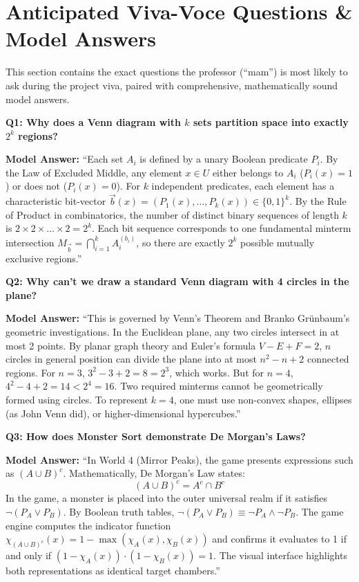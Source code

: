 \documentclass[11pt,a4paper]{article}
\theoremstyle{definition}
\begin{document}
\newpage
\section{Anticipated Viva-Voce Questions \& Model Answers}

This section contains the exact questions the professor (``mam'') is most likely to ask during the project viva, paired with comprehensive, mathematically sound model answers.

\begin{vivabox}
\textbf{Q1: Why does a Venn diagram with $k$ sets partition space into exactly $2^k$ regions?}

\textbf{Model Answer:}
``Each set $A_i$ is defined by a unary Boolean predicate $P_i$. By the Law of Excluded Middle, any element $x \in U$ either belongs to $A_i$ ($P_i(x) = 1$) or does not ($P_i(x) = 0$). For $k$ independent predicates, each element has a characteristic bit-vector $\vec{b}(x) = (P_1(x), \dots, P_k(x)) \in \{0, 1\}^k$. By the Rule of Product in combinatorics, the number of distinct binary sequences of length $k$ is $2 \times 2 \times \dots \times 2 = 2^k$. Each bit sequence corresponds to one fundamental minterm intersection $M_{\vec{b}} = \bigcap_{i=1}^k A_i^{(b_i)}$, so there are exactly $2^k$ possible mutually exclusive regions.''
\end{vivabox}

\begin{vivabox}
\textbf{Q2: Why can't we draw a standard Venn diagram with 4 circles in the plane?}

\textbf{Model Answer:}
``This is governed by Venn's Theorem and Branko Gr{\"u}nbaum's geometric investigations. In the Euclidean plane, any two circles intersect in at most 2 points. By planar graph theory and Euler's formula $V - E + F = 2$, $n$ circles in general position can divide the plane into at most $n^2 - n + 2$ connected regions. For $n = 3$, $3^2 - 3 + 2 = 8 = 2^3$, which works. But for $n = 4$, $4^2 - 4 + 2 = 14 < 2^4 = 16$. Two required minterms cannot be geometrically formed using circles. To represent $k=4$, one must use non-convex shapes, ellipses (as John Venn did), or higher-dimensional hypercubes.''
\end{vivabox}

\begin{vivabox}
\textbf{Q3: How does Monster Sort demonstrate De Morgan's Laws?}

\textbf{Model Answer:}
``In World 4 (Mirror Peaks), the game presents expressions such as $(A \cup B)^c$.
Mathematically, De Morgan's Law states:
$$(A \cup B)^c = A^c \cap B^c$$
In the game, a monster is placed into the outer universal realm if it satisfies $\neg(P_A \lor P_B)$. By Boolean truth tables, $\neg(P_A \lor P_B) \equiv \neg P_A \land \neg P_B$. The game engine computes the indicator function $\chi_{(A \cup B)^c}(x) = 1 - \max(\chi_A(x), \chi_B(x))$ and confirms it evaluates to 1 if and only if $(1 - \chi_A(x)) \cdot (1 - \chi_B(x)) = 1$. The visual interface highlights both representations as identical target chambers.''
\end{vivabox}
\end{document}
